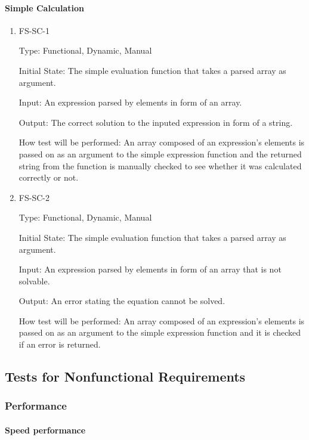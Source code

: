\documentclass[12pt, titlepage]{article}
\begin{document}
\paragraph{Simple Calculation}
\begin{enumerate}

\item{FS-SC-1}

Type: Functional, Dynamic, Manual
					
Initial State: The simple evaluation function that takes a parsed array as argument.
					
Input: An expression parsed by elements in form of an array.
					
Output: The correct solution to the inputed expression in form of a string. 
					
How test will be performed: An array composed of an expression's elements is passed on as an argument to the simple expression function and the returned string from the function is manually checked to see whether it was calculated correctly or not.
					
\item{FS-SC-2}

Type: Functional, Dynamic, Manual
					
Initial State: The simple evaluation function that takes a parsed array as argument.
					
Input: An expression parsed by elements in form of an array that is not solvable.
					
Output: An error stating the equation cannot be solved. 
					
How test will be performed: An array composed of an expression's elements is passed on as an argument to the simple expression function and it is checked if an error is returned. 

\end{enumerate}

\subsection{Tests for Nonfunctional Requirements}

\subsubsection{Performance}
		
\paragraph{Speed performance}
\end{document}
